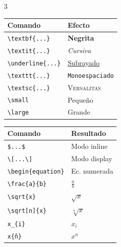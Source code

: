\documentclass[10pt,landscape]{article}
\newcommand{\comando}[1]{\texttt{\textcolor{azulprofundo}{#1}}}
\begin{document}
\begin{multicols}{3}
\begin{tabular}{@{}ll@{}}
    \toprule
    \textbf{Comando} & \textbf{Efecto} \\
    \midrule
    \comando{\textbackslash textbf\{...\}} & \textbf{Negrita} \\
    \comando{\textbackslash textit\{...\}} & \textit{Cursiva} \\
    \comando{\textbackslash underline\{...\}} & \underline{Subrayado} \\
    \comando{\textbackslash texttt\{...\}} & \texttt{Monoespaciado} \\
    \comando{\textbackslash textsc\{...\}} & \textsc{Versalitas} \\
    \comando{\textbackslash small} & \small{Pequeño} \\
    \comando{\textbackslash large} & \large{Grande} \\
    \bottomrule
\end{tabular}

\vspace{0.5cm}

\tcbox[colback=grisclaro, colframe=verdeexito, arc=3pt, boxsep=2pt, left=2pt, right=2pt, top=2pt, bottom=2pt]{
    \textbf{\textcolor{verdeexito}{📐 MATEMÁTICAS}}
}
\vspace{0.3cm}

\begin{tabular}{@{}ll@{}}
    \toprule
    \textbf{Comando} & \textbf{Resultado} \\
    \midrule
    \comando{\$...\$} & Modo inline \\
    \comando{\textbackslash[...\textbackslash]} & Modo display \\
    \comando{\textbackslash begin\{equation\}} & Ec. numerada \\
    \comando{\textbackslash frac\{a\}\{b\}} & $\frac{a}{b}$ \\
    \comando{\textbackslash sqrt\{x\}} & $\sqrt{x}$ \\
    \comando{\textbackslash sqrt[n]\{x\}} & $\sqrt[n]{x}$ \\
    \comando{x\_\{i\}} & $x_i$ \\
    \comando{x\^\{n\}} & $x^n$ \\
    \bottomrule
\end{tabular}

\vspace{0.5cm}


\end{multicols}
\end{document}
